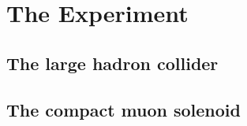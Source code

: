 \chapter{The Experiment}\label{chap:experiment}

\section{The large hadron collider}\label{sec:LHC}

\section{The compact muon solenoid}\label{sec:CMS}
